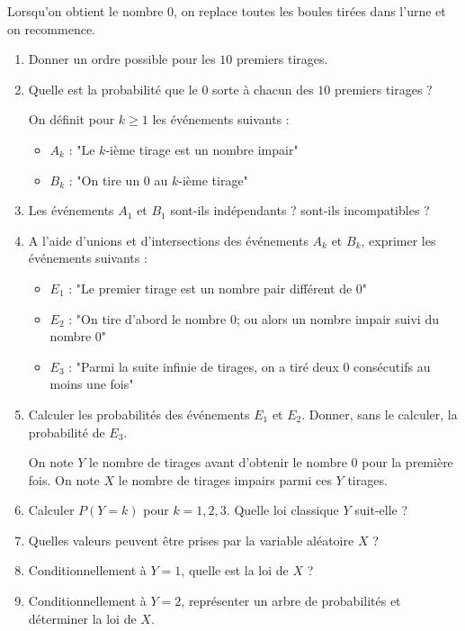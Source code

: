 \documentclass[10pt]{article}
\begin{document}
\noindent Lorsqu'on obtient le nombre $0$, on replace toutes les boules tirées dans l'urne et on recommence.

\vspace{1em}

\begin{enumerate}
    \item Donner un ordre possible pour les $10$ premiers tirages. 
    \item Quelle est la probabilité que le $0$ sorte à chacun des $10$ premiers tirages ?

    \vspace{0.5em}
    On définit pour $k\geq 1$ les événements suivants : 
    \begin{itemize}
        \item $A_k$ : "Le $k$-ième tirage est un nombre impair"
        \item $B_k$ : "On tire un $0$ au $k$-ième tirage"
    \end{itemize}
    \item Les événements $A_1$ et $B_1$ sont-ils indépendants ? sont-ils incompatibles ?

    \item A l'aide d'unions et d'intersections des événements $A_k$ et $B_k$, exprimer les événements suivants : 
    \begin{itemize}
        \item $E_1$ : "Le premier tirage est un nombre pair différent de $0$"
        \item $E_2$ : "On tire d'abord le nombre $0$; ou alors un nombre impair suivi du nombre $0$"
        \item $E_3$ : "Parmi la suite infinie de tirages, on a tiré deux $0$ consécutifs au moins une fois"
    \end{itemize}
    \item Calculer les probabilités des événements $E_1$ et $E_2$. \newline 
    Donner, sans le calculer, la probabilité de $E_3$.

    \vspace{1em}
    On note $Y$ le nombre de tirages avant d'obtenir le nombre $0$ pour la première fois.\newline
    On note $X$ le nombre de tirages impairs parmi ces $Y$ tirages.

    \item  Calculer $P(Y=k)$ pour $k=1, 2, 3$. Quelle loi classique $Y$ suit-elle ?

    \item  Quelles valeurs peuvent être prises par la variable aléatoire $X$ ? 

    \item  Conditionnellement à $Y = 1$, quelle est la loi de $X$ ? 

    \item  Conditionnellement à $Y = 2$, représenter un arbre de probabilités et déterminer la loi de $X$. 
\end{enumerate}
\end{document}
